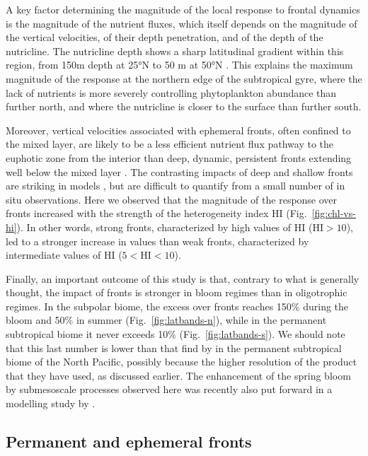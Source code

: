 A key factor determining the magnitude of the local  response to frontal dynamics is the magnitude of the nutrient fluxes, which itself depends on the magnitude of the vertical velocities, of their depth penetration, and of the depth of the nutricline.
The nutricline depth shows a sharp latitudinal gradient within this region, from 150m depth at 25°N to 50 m at 50°N \citep{romera-castillo_2016}.
This explains the maximum magnitude of the  response at the northern edge of the subtropical gyre, where the lack of nutrients is more severely controlling phytoplankton abundance than further north, and where the nutricline is closer to the surface than further south.

Moreover, vertical velocities associated with ephemeral fronts, often confined to the mixed layer, are likely to be a less efficient nutrient flux pathway to the euphotic zone from the interior than deep, dynamic, persistent fronts extending well below the mixed layer \citep{levy_2018}.
The contrasting impacts of deep and shallow fronts are striking in models \citep{levy_2012}, but are difficult to quantify from a small number of in situ observations.
Here we observed that the magnitude of the  response over fronts increased with the strength of the heterogeneity index HI (Fig.~\ref{fig:chl-vs-hi}).
In other words, strong fronts, characterized by high values of HI (\(\mathrm{HI} > 10\)), led to a stronger increase in  values than weak fronts, characterized by intermediate values of HI (\(5 < \mathrm{HI} < 10\)).

Finally, an important outcome of this study is that, contrary to what is generally thought, the impact of fronts is stronger in bloom regimes than in oligotrophic regimes.
In the subpolar biome, the   excess over fronts reaches 150\% during the bloom and 50\% in summer (Fig.~\ref{fig:latbands-n}), while in the permanent subtropical biome it never exceeds  10\% (Fig.~\ref{fig:latbands-s}).
We should note that this last number is lower than that find by \citet{liu_2016} in the permanent subtropical biome of the North Pacific, possibly because the higher resolution of the product that they have used, as discussed earlier.
The enhancement of the spring bloom by submesoscale processes observed here was recently also put forward in a modelling study by \citet{simoes-sousa_2022}.

\subsection{Permanent and ephemeral fronts}

